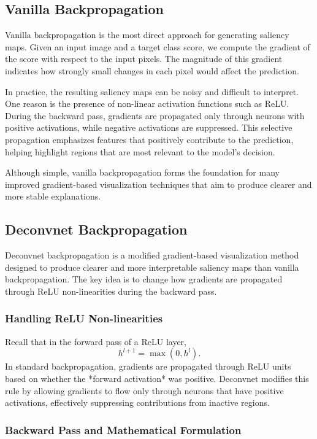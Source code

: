 \documentclass{article}
\begin{document}
\subsection{Vanilla Backpropagation}

Vanilla backpropagation is the most direct approach for generating saliency maps. Given an input image and a target class score, we compute the gradient of the score with respect to the input pixels. The magnitude of this gradient indicates how strongly small changes in each pixel would affect the prediction.

In practice, the resulting saliency maps can be noisy and difficult to interpret. One reason is the presence of non-linear activation functions such as ReLU. During the backward pass, gradients are propagated only through neurons with positive activations, while negative activations are suppressed. This selective propagation emphasizes features that positively contribute to the prediction, helping highlight regions that are most relevant to the model’s decision.

Although simple, vanilla backpropagation forms the foundation for many improved gradient-based visualization techniques that aim to produce clearer and more stable explanations.

\subsection{Deconvnet Backpropagation}

Deconvnet backpropagation is a modified gradient-based visualization method designed to produce clearer and more interpretable saliency maps than vanilla backpropagation. The key idea is to change how gradients are propagated through ReLU non-linearities during the backward pass.

\subsubsection{Handling ReLU Non-linearities}

Recall that in the forward pass of a ReLU layer,
\[
h^{l+1} = \max(0, h^l).
\]
In standard backpropagation, gradients are propagated through ReLU units based on whether the *forward activation* was positive. Deconvnet modifies this rule by allowing gradients to flow only through neurons that have positive activations, effectively suppressing contributions from inactive regions.

\subsubsection{Backward Pass and Mathematical Formulation}
\end{document}
